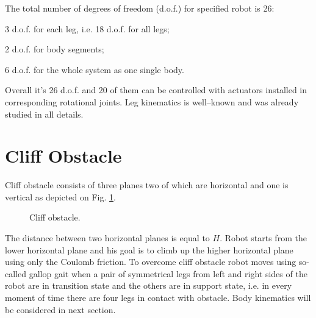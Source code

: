 \documentclass{ws-procs9x6}
\begin{document}
The total number of degrees of freedom (d.o.f.) for specified robot is 26:
\begin{itemlist}
      \item	3 d.o.f. for each leg, i.e. 18 d.o.f. for all legs;
      \item 2 d.o.f. for body segments;
      \item	6 d.o.f. for the whole system as one single body.
\end{itemlist}
Overall it's 26 d.o.f. and 20 of them can be controlled with actuators installed in corresponding rotational joints. Leg kinematics is well--known and was already studied in all details.



\section{Cliff Obstacle}
Cliff obstacle consists of three planes two of which are horizontal and one is vertical as depicted on Fig. \ref{aba:cliff}.


\begin{figure}
  \begin{center}
  \end{center}
  \caption{Cliff obstacle.}
  \label{aba:cliff}
\end{figure}

The distance between two horizontal planes is equal to $H$. Robot starts from the lower horizontal plane and his goal is to climb up the higher horizontal plane using only the Coulomb friction.
To overcome cliff obstacle robot moves using so-called gallop gait when a pair of symmetrical legs from left and right sides of the robot are in transition state and the others are in support state, i.e. in every moment of time there are four legs in contact with obstacle. Body kinematics will be considered in next section.

\end{document}

